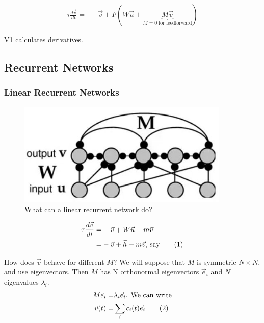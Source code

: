 \documentclass[]{article}
\newcommand\numberthis{\addtocounter{equation}{1}\tag{\theequation}}
\begin{document}
\begin{align*}
	\tau\frac{d\vec{v}}{dt} =& -\vec{v} + F(W \vec{u} + \underbrace{M \vec{v}}_\text{$M=0$ for feedforward})
\end{align*}

V1 calculates derivatives.

\subsection{Recurrent Networks}

\subsubsection{Linear Recurrent Networks}

\begin{figure}[H]
	\begin{center}
		\caption{What can a linear recurrent network do?}
		\includegraphics[width=0.9\textwidth]{linear-recurrent-network}
	\end{center}
\end{figure}

\begin{align*}
	\tau \frac{d\vec{v}}{dt} =& -\vec{v} + W\vec{u} +m \vec{v}\\
	=& -\vec{v} +\vec{h} +m \vec{v} \text{, say} \numberthis \label{eq:recurrent:network}
\end{align*}

How does $\vec{v}$ behave for different $M$? We will suppose that $M$ is symmetric $N\times N$, and use eigenvectors. Then $M$ has N orthonormal eigenvectors $\vec{e}_i$ and $N$ eigenvalues $\lambda_i$.
\begin{align*}
	M \vec{e}_i =& \lambda_i \vec{e}_i \text{. We can write}\\
	\vec{v}(t) =& \sum_{i} c_i(t) \vec{e}_i \numberthis \label{eq:ev:expansion}
\end{align*}
\end{document}
